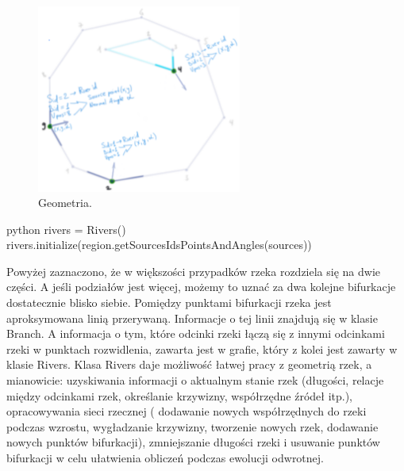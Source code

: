 \documentclass[]{pracamgr}
\begin{document}
      \begin{figure}[H]
        \centering
        \includegraphics[width=0.6\textwidth]{figs/rivers_initialization.png}        
        \caption {Geometria.}
        \label{rivers_initialization}
      \end{figure}

      \begin{mintedbox}{python}
        rivers = Rivers()
        rivers.initialize(region.getSourcesIdsPointsAndAngles(sources))\end{mintedbox}
      
      Powyżej zaznaczono, że w większości przypadków rzeka rozdziela się na dwie części. A jeśli podziałów jest więcej, możemy to uznać za dwa kolejne bifurkacje dostatecznie blisko siebie. Pomiędzy punktami bifurkacji rzeka jest aproksymowana linią przerywaną. Informacje o tej linii znajdują się w klasie Branch. A informacja o tym, które odcinki rzeki łączą się z innymi odcinkami rzeki w punktach rozwidlenia, zawarta jest w grafie, który z kolei jest zawarty w klasie Rivers. Klasa Rivers daje możliwość łatwej pracy z geometrią rzek, a mianowicie: uzyskiwania informacji o aktualnym stanie rzek (długości, relacje między odcinkami rzek, określanie krzywizny, współrzędne źródeł itp.), opracowywania sieci rzecznej ( dodawanie nowych współrzędnych do rzeki podczas wzrostu, wygładzanie krzywizny, tworzenie nowych rzek, dodawanie nowych punktów bifurkacji), zmniejszanie długości rzeki i usuwanie punktów bifurkacji w celu ułatwienia obliczeń podczas ewolucji odwrotnej.
      
\end{document}

